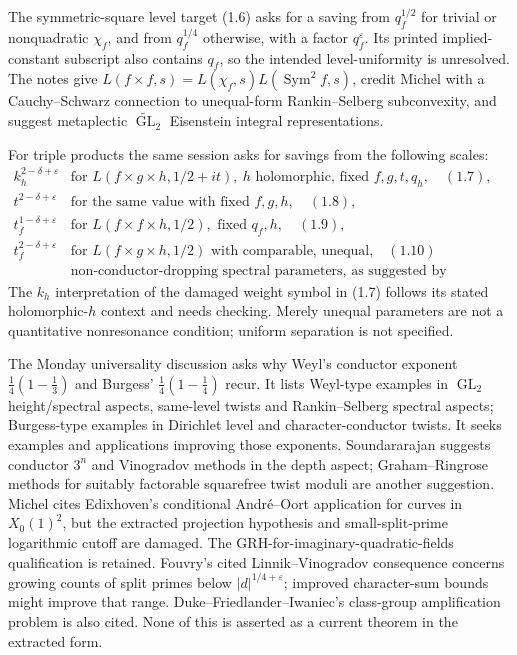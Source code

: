 \documentclass[11pt]{article}
\begin{document}
The symmetric-square level target (1.6) asks for a saving from $q_f^{1/2}$ for trivial or nonquadratic $\chi_f$, and from $q_f^{1/4}$ otherwise, with a factor $q_f^\varepsilon$. Its printed implied-constant subscript also contains $q_f$, so the intended level-uniformity is unresolved. The notes give $L(f\times f,s)=L(\chi_f,s)L(\operatorname{Sym}^2 f,s)$, credit Michel with a Cauchy--Schwarz connection to unequal-form Rankin--Selberg subconvexity, and suggest metaplectic $\widetilde{\operatorname{GL}}_2$ Eisenstein integral representations.

For triple products the same session asks for savings from the following scales:
\[
 \begin{array}{ll}
 k_h^{2-\delta+\varepsilon}&\text{for }L(f\times g\times h,1/2+it),\ h\text{ holomorphic, fixed }f,g,t,q_h,\quad(1.7),\\
 t^{2-\delta+\varepsilon}&\text{for the same value with fixed }f,g,h,\quad(1.8),\\
 t_f^{1-\delta+\varepsilon}&\text{for }L(f\times f\times h,1/2),\text{ fixed }q_f,h,\quad(1.9),\\
 t_f^{2-\delta+\varepsilon}&\text{for }L(f\times g\times h,1/2)\text{ with comparable, unequal,}\quad(1.10)\!\!\\
 &\text{non-conductor-dropping spectral parameters, as suggested by Reznikov.}
 \end{array}
\]
The $k_h$ interpretation of the damaged weight symbol in (1.7) follows its stated holomorphic-$h$ context and needs checking. Merely unequal parameters are not a quantitative nonresonance condition; uniform separation is not specified.

The Monday universality discussion asks why Weyl's conductor exponent $\tfrac14(1-\tfrac13)$ and Burgess' $\tfrac14(1-\tfrac14)$ recur. It lists Weyl-type examples in $\operatorname{GL}_2$ height/spectral aspects, same-level twists and Rankin--Selberg spectral aspects; Burgess-type examples in Dirichlet level and character-conductor twists. It seeks examples and applications improving those exponents. Soundararajan suggests conductor $3^n$ and Vinogradov methods in the depth aspect; Graham--Ringrose methods for suitably factorable squarefree twist moduli are another suggestion. Michel cites Edixhoven's conditional Andr\'e--Oort application for curves in $X_0(1)^2$, but the extracted projection hypothesis and small-split-prime logarithmic cutoff are damaged. The GRH-for-imaginary-quadratic-fields qualification is retained. Fouvry's cited Linnik--Vinogradov consequence concerns growing counts of split primes below $|d|^{1/4+\varepsilon}$; improved character-sum bounds might improve that range. Duke--Friedlander--Iwaniec's class-group amplification problem is also cited. None of this is asserted as a current theorem in the extracted form.
\end{document}
